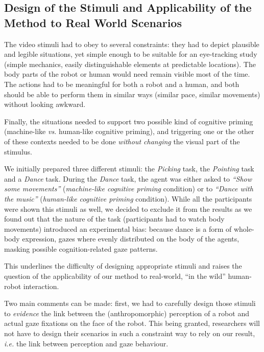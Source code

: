 \documentclass[lettersize, noapacite, twoside, HRI]{apa_HRI}
\newcommand{\ie}{\textit{i.e.}\xspace}
\newcommand{\vs}{\textit{vs.}\xspace}
\begin{document}
\subsection{Design of the Stimuli and Applicability of the Method to Real World
Scenarios}
\label{stimuli_design}

The video stimuli had to obey to several constraints: they had to depict
plausible and legible situations, yet simple enough to be suitable for an
eye-tracking study (simple mechanics, easily distinguishable elements at
predictable locations). The body parts of the robot or human would need remain
visible most of the time. The actions had to be meaningful for both a robot and
a human, and both should be able to perform them in similar ways (similar pace,
similar movements) without looking awkward.

Finally, the situations needed to support two possible kind of cognitive priming
(machine-like \vs human-like cognitive priming), and triggering one or the other of these
contexts needed to be done \emph{without changing} the visual part of the
stimulus.

We initially prepared three different stimuli: the \emph{Picking} task, the
\emph{Pointing} task and a \emph{Dance} task.  During the \emph{Dance} task, the
agent was either asked to \emph{``Show some movements''} (\emph{machine-like
cognitive priming} condition) or to \emph{``Dance with the music''}
(\emph{human-like cognitive priming} condition). While all the participants were
shown this stimuli as well, we decided to exclude it from the results as we
found out that the nature of the task (participants had to watch body movements)
introduced an experimental bias: because dance is a form of whole-body
expression, gazes where evenly distributed on the body of the agents, masking
possible cognition-related gaze patterns.

This underlines the difficulty of designing appropriate stimuli and raises the
question of the applicability of our method to real-world, ``in the wild''
human-robot interaction.

Two main comments can be made: first, we had to carefully design those stimuli
to \emph{evidence} the link between the (anthropomorphic) perception of a robot
and actual gaze fixations on the face of the robot. This being granted,
researchers will not have to design their scenarios in such a constraint way to
rely on our result, \ie the link between perception and gaze behaviour.
\end{document}
